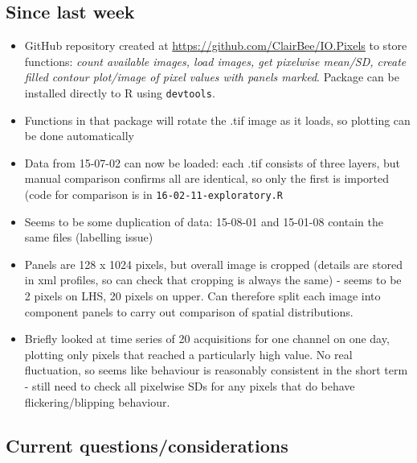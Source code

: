 \documentclass[10pt,fleqn]{article}
\begin{document}
\subsection*{Since last week}

\begin{itemize}

\item
GitHub repository created at \url{https://github.com/ClairBee/IO.Pixels} to store functions: \textit{count available images, load images, get pixelwise mean/SD, create filled contour plot/image of pixel values with panels marked}. Package can be installed directly to R using \texttt{devtools}.

\item
Functions in that package will rotate the .tif image as it loads, so plotting can be done automatically

\item
Data from 15-07-02 can now be loaded: each .tif consists of three layers, but manual comparison confirms all are identical, so only the first is imported (code for comparison is in \texttt{16-02-11-exploratory.R}

\item
Seems to be some duplication of data: 15-08-01 and 15-01-08 contain the same files (labelling issue)

\item
Panels are 128 x 1024 pixels, but overall image is cropped (details are stored in xml profiles, so can check that cropping is always the same) - seems to be 2 pixels on LHS, 20 pixels on upper. Can therefore split each image into component panels to carry out comparison of spatial distributions.

\item
Briefly looked at time series of 20 acquisitions for one channel on one day, plotting only pixels that reached a particularly high value. No real fluctuation, so seems like behaviour is reasonably consistent in the short term - still need to check all pixelwise SDs for any pixels that do behave flickering/blipping behaviour.

\end{itemize}

\subsection*{Current questions/considerations}
\end{document}

